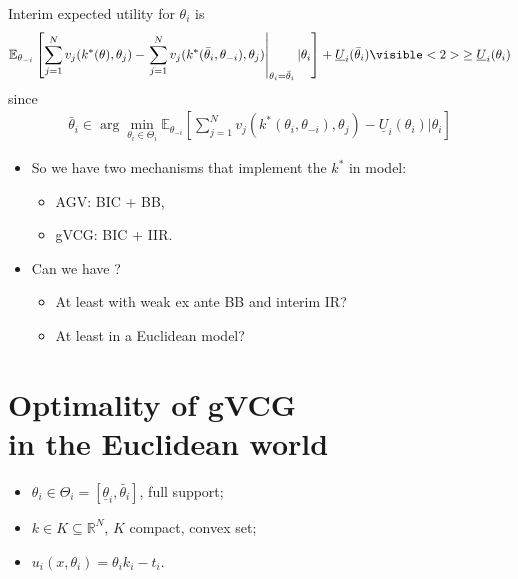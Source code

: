 \documentclass[english,handout,10pt]{beamer}		%
\def\lyxframeend{} %
\begin{document}
Interim expected utility for $\theta_i$ is
{\small
	\begin{align*}
		\mathbb{E}_{\theta_{-i}} \left[ \sum_{j =1}^N v_j (k^*(\theta),\theta_j) - \left. \sum_{j =1}^N v_j (k^*(\bar{\theta}_i,\theta_{-i}),\theta_j) \right|_{\theta_i = \bar{\theta}_i} | \theta_i \right] + \underline{U}_i (\bar{\theta}_i)
		\visible<2>{
			\geq \underline{U}_i(\theta_i)
		}
	\end{align*}
}
\pause
since
\begin{align*}
	\bar{\theta}_i \in \arg \min_{\theta_i \in \Theta_i} \mathbb{E}_{\theta_{-i}} \left[ \sum_{j=1}^{N} v_j (k^*(\theta_i,\theta_{-i}),\theta_j) - \underline{U}_i (\theta_i) | \theta_i \right]
\end{align*}
\lyxframeend


\begin{itemize}
	\item So we have two mechanisms that implement the  $k^*$ in  model:
	\begin{itemize}
		\item AGV: BIC + BB,
		\item gVCG: BIC + IIR.
	\end{itemize}
	\pause
	\item Can we have ? 
	\begin{itemize}
		\item At least with weak ex ante BB and interim IR?
		\item At least in a \alert{Euclidean} model?
	\end{itemize}
\end{itemize}
\lyxframeend


\section{Optimality of gVCG \\ in the Euclidean world}

\begin{itemize}
	\item $\theta_i \in \Theta_{i} = [\underline{\theta}_i, \bar{\theta}_i]$, full support;
	\item $k \in K \subseteq \mathbb{R}^N$, $K$ compact, convex set;
	\item $u_i(x,\theta_i) = \theta_i k_i - t_i$.
\end{itemize}
\lyxframeend
\end{document}
